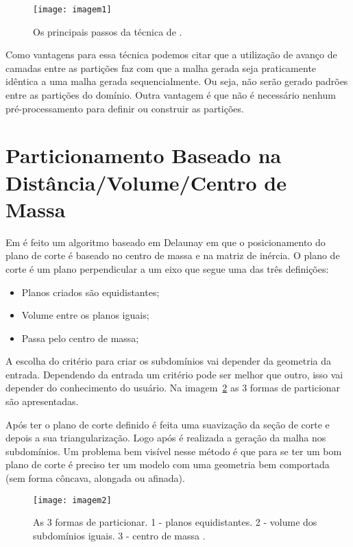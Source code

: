  \begin{figure}[htbp]
     \centering
     \texttt{[image: imagem1]}
     \caption{Os principais passos da técnica de \cite{bib:Pirzadeh09}.}
     \label{fig:imagem1}
 \end{figure}
 
 Como vantagens para essa técnica podemos citar que a utilização de avanço de camadas entre as partições faz com que a malha gerada seja praticamente idêntica a uma malha gerada sequencialmente. Ou seja, não serão gerado padrões entre as partições do domínio. Outra vantagem é que não é necessário nenhum pré-processamento para definir ou construir as partições.

\section{Particionamento Baseado na Distância/Volume/Centro de Massa}
 
Em \cite{bib:Ivanov06} é feito um algoritmo baseado em Delaunay em que o posicionamento do plano de corte é baseado no centro de massa e na matriz de inércia. O plano de corte é um plano perpendicular a um eixo que segue uma das três definições:

\begin{itemize}
  \item Planos criados são equidistantes;

  \item Volume entre os planos iguais;

  \item Passa pelo centro de massa;
\end{itemize}

A escolha do critério para criar os subdomínios vai depender da geometria da entrada. Dependendo da entrada um critério pode ser melhor que outro, isso vai depender do conhecimento do usuário. Na imagem~\ref{fig:imagem2} as 3 formas de particionar são apresentadas.

Após ter o plano de corte definido é feita uma suavização da seção de corte e depois a sua triangularização. Logo após é realizada a geração da malha nos subdomínios. Um problema bem visível nesse método é que para se ter um bom plano de corte é preciso ter um modelo com uma geometria bem comportada (sem forma côncava, alongada ou afinada).

 \begin{figure}[htbp]
     \centering
     \texttt{[image: imagem2]}
     \caption{As 3 formas de particionar. 1 - planos equidistantes. 2 - volume dos subdomínios iguais. 3 - centro de massa \cite{bib:Ivanov06}.}
     \label{fig:imagem2}
 \end{figure}

